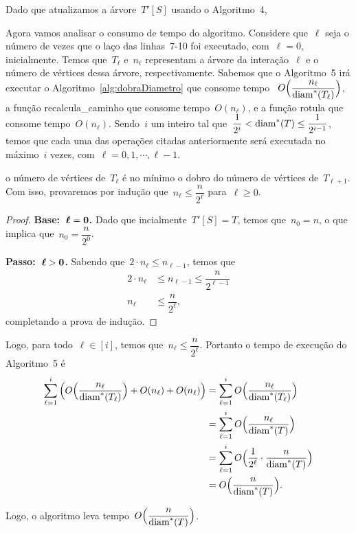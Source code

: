 		Dado que atualizamos a árvore~$T'[S]$ usando o Algoritmo~4,
		\bigskip

		Agora vamos analisar o consumo de tempo do algoritmo.
		Considere que~$\ell$ seja o número de vezes que o laço
		das linhas~7-10 foi executado, com~$\ell = 0$, inicialmente.
		Temos que~$T_\ell$ e~$n_\ell$ 
		representam a árvore da interação~$\ell$ e
		o número de vértices dessa árvore, respectivamente.
		Sabemos que o Algoritmo~5 
		irá executar
		o Algoritmo~\ref{alg:dobraDiametro} que consome 
		tempo ~${O\Big(\dfrac{n_\ell}{\mathrm{diam}^*(T_\ell)}\Big)}$, a função
		{\sc recalcula\_caminho} que consome tempo~$O(n_\ell)$, e a função
		{\sc rotula} que consome tempo~$O(n_\ell)$.
		Sendo~$i$ um inteiro tal que~${\dfrac{1}{2^i}< \mathrm{diam}^*(T)\le \dfrac{1}{2^{i-1}}}$, 
		temos que cada uma das operações citadas anteriormente
		será executada no máximo~$i$ vezes, com~$\ell =  0,1,\cdots, \ell-1$.

		o número de vértices de~$T_{\ell}$
		é no mínimo o 
		dobro do número de vértices de~$T_{\ell+1}$.
		Com isso, provaremos por indução que~$n_\ell\le \dfrac{n}{2^{\ell}}$
		para~$\ell\ge 0$.
		\begin{proof}
		\textbf{Base:~${\mathbf {\boldsymbol\ell = 0}}$.} Dado que incialmente~$T'[S] = T$,
		temos que~$n_0 = n$, o que implica que~$n_0 = \dfrac{n}{2^0}$. 

		\textbf{Passo:~$\mathbf{\boldsymbol\ell>0}$.} Sabendo que~$2\cdot n_\ell \le n_{\ell -1}$, temos que
		\begin{align}
			2\cdot n_{\ell} &\le n_{\ell-1}\le \dfrac{n}{2^{\ell-1}} \nonumber \\
			n_{\ell} &\le \dfrac{n}{2^{\ell}}, \nonumber
		\end{align}
		completando a prova de indução.
		\end{proof}

		Logo, para todo~$\ell\in[i]$, temos que~$n_\ell \le\dfrac{n} {2^{\ell}}$.
		Portanto o tempo de execução do Algoritmo~5 é
		\begin{align}
			\displaystyle\sum_{\ell=1}^{i} \Big(O\Big(\dfrac{n_\ell}{\mathrm{diam}^*(T_\ell)}\Big)
			+ O(n_\ell) + O(n_\ell)\Big)
			&= \displaystyle\sum_{\ell=1}^{i} O\Big(\dfrac{n_\ell}{\mathrm{diam}^*(T_\ell)}\Big) \nonumber\\
			&= \displaystyle\sum_{\ell=1}^{i} O\Big(\dfrac{n_\ell}{\mathrm{diam}^*(T)}\Big) \nonumber\\
			&= \displaystyle\sum_{\ell=1}^{i} O\Big(\dfrac{1}{2^{\ell}}
			\cdot\dfrac{n}{\mathrm{diam}^*(T)}\Big) \nonumber\\
			&= O\Big(\dfrac{n}{\mathrm{diam}^*(T)}\Big). \nonumber
		\end{align}

		Logo, o algoritmo leva tempo~$O\Big(\dfrac{n}{\mathrm{diam}^*(T)}\Big)$.

		\bigskip
		\bigskip
		\bigskip
